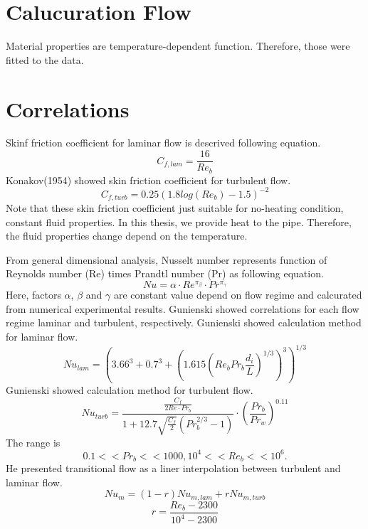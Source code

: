 \documentclass[conference]{IEEEtran}
\begin{document}
\section{Calucuration Flow}
Material properties are temperature-dependent function.
Therefore, those were fitted to the data.

\section{Correlations}
Skinf friction coefficient for laminar flow is descrived following equation.
\begin{equation}
C_{f,lam}=\frac{16}{Re_{b}}
\end{equation}
Konakov(1954) showed skin friction coefficient for turbulent flow.
\begin{equation}
C_{f,turb}=0.25(1.8log(Re_{b})-1.5)^{-2}
\end{equation}
Note that these skin friction coefficient just suitable for no-heating condition, constant fluid properties.
In this thesis, we provide heat to the pipe.
Therefore, the fluid properties change depend on the temperature.

From general dimensional analysis, Nusselt number represents function of Reynolds number (Re) times Prandtl number (Pr) as following equation.
\begin{equation}
Nu=\alpha \cdot Re^{\pi_{\beta}}\cdot Pr^{\pi_{\gamma}}\label{Nu_dimensional}
\end{equation}
Here, factors $\alpha$, $\beta$ and $\gamma$ are constant value depend on flow regime and calcurated from numerical experimental results.
Gunienski\cite{Gnienlinski2010} showed correlations for each flow regime laminar and turbulent, respectively.
Gunienski\cite{Gnienlinski2010} showed calculation method for laminar flow.
\begin{equation}
Nu_{lam}=(3.66^{3}+0.7^{3}+(1.615(Re_{b}Pr_{b}\frac{d_{i}}{L})^{1/3})^{3})^{1/3}\label{Nu_laminar}
\end{equation}
Gunienski\cite{Gnienlinski2010} showed calculation method for turbulent flow.
\begin{equation}
Nu_{turb}=\frac{\frac{C_{f}}{2Re\cdot Pr_{b}}}{1+12.7 \sqrt{\frac{C_{f}}{2}}(Pr_{b}^{2/3}-1)}\cdot (\frac{Pr_{b}}{Pr_{w}})^{0.11}
\end{equation}
The range is
\begin{equation}
0.1<<Pr_{b}<<1000, 10^{4}<<Re_{b}<<10^{6}.
\end{equation}
He presented transitional flow as a liner interpolation between turbulent and laminar flow.
\begin{equation}
Nu_{m}=(1-r)Nu_{m,lam}+rNu_{m,turb}
\label{Nu_m}
\end{equation}
\begin{equation}
r=\frac{Re_{b}-2300}{10^{4}-2300}
\end{equation}
\end{document}
